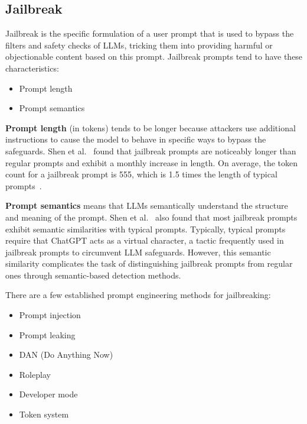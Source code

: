 \subsection{Jailbreak \label{sec:jailbreak}}
Jailbreak is the specific formulation of a user prompt that is used to bypass the filters and safety checks of LLMs, tricking them into providing harmful or objectionable content based on this prompt.
Jailbreak prompts tend to have these characteristics:
\begin{itemize}
    \item Prompt length
    \item Prompt semantics
\end{itemize}

\textbf{Prompt length} (in tokens) tends to be longer because attackers use additional instructions to cause the model to behave in specific ways to bypass the safeguards.
Shen et al.~\cite{shen2024donowcharacterizingevaluating} found that jailbreak prompts are noticeably longer than regular prompts and exhibit a monthly increase in length. On average, the token count for a jailbreak prompt is 555, which is 1.5 times the length of typical prompts~\cite{shen2024donowcharacterizingevaluating}.

\textbf{Prompt semantics} means that LLMs semantically understand the structure and meaning of the prompt. Shen et al.~\cite{shen2024donowcharacterizingevaluating} also found that most jailbreak prompts exhibit semantic similarities with typical prompts. Typically, typical prompts require that ChatGPT acts as a virtual character, a tactic frequently used in jailbreak prompts to circumvent LLM safeguards. However, this semantic similarity complicates the task of distinguishing jailbreak prompts from regular ones through semantic-based detection methods.~\cite{shen2024donowcharacterizingevaluating}

There are a few established prompt engineering methods for jailbreaking:
\begin{itemize}
    \item Prompt injection
    \item Prompt leaking
    \item DAN (Do Anything Now)
    \item Roleplay
    \item Developer mode
    \item Token system
\end{itemize}

